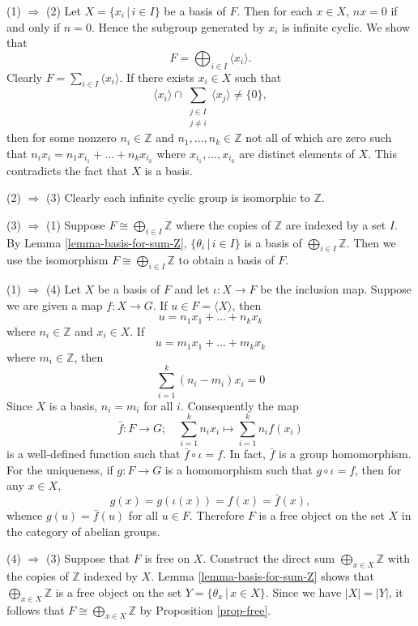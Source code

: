 \begin{sketch}
	(1) $\Rightarrow$ (2) Let $X = \{x_i\,|\, i\in I\}$ be a basis of $F$. Then for each $x \in X$, $nx = 0$ if and only if $n=0$. Hence the subgroup generated by $x_i$ is infinite cyclic. We show that \begin{equation*}
		F = \bigoplus_{i\in I} \langle x_i\rangle.
	\end{equation*} Clearly $F = \sum_{i\in I} \langle x_i\rangle$. If there exists $x_i\in X$ such that $$\langle x_i \rangle \cap \sum_{\substack{j \in I \\ j\neq i}} \langle x_j \rangle \neq \{0\},$$ then for some nonzero $n_i \in \mathbb{Z}$ and $n_{1},\dots, n_{k}\in\mathbb{Z}$ not all of which are zero such that
	$
		n_ix_i = n_{1} x_{i_1} + \dots + n_k  x_{i_k}
	$ where $x_{i_1}, \dots, x_{i_k}$ are distinct elements of $X$. This contradicts the fact that $X$ is a basis.
	
	(2) $\Rightarrow$ (3) Clearly each infinite cyclic group is isomorphic to $\mathbb{Z}$.
	
	(3) $\Rightarrow$ (1) Suppose $F \cong \bigoplus_{i\in I} \mathbb{Z}$ where the copies of $\mathbb{Z}$ are indexed by a set $I$. By Lemma \ref{lemma-basis-for-sum-Z}, $\{\theta_i \,|\,  i \in I\}$ is a basis of $\bigoplus_{i\in I} \mathbb{Z}$. Then we use the isomorphism $F\cong \bigoplus_{i\in I} \mathbb{Z}$ to obtain a basis of $F$.
	
	(1) $\Rightarrow$ (4) Let $X$ be a basis of $F$ and let $\iota: X \rightarrow F$ be the inclusion map. Suppose we are given a map $f: X \rightarrow G$. If $u \in F = \langle X\rangle$, then 
	\begin{equation*}
	u = n_1 x_1 + \dots + n_k x_k
	\end{equation*} where $n_i \in \mathbb{Z}$ and $x_i \in X$. If $$u = m_1 x_1 + \dots + m_k x_k$$ where $m_i \in \mathbb{Z}$, then $$\sum_{i=1}^k (n_i - m_i) x_i = 0$$ Since $X$ is a basis, $n_i = m_i$ for all $i$. Consequently the map 
	\begin{equation*}
		\bar{f}: F \rightarrow G;\quad \sum_{i=1}^k n_i x_i \mapsto \sum_{i=1}^k n_i f(x_i) 
	\end{equation*}  is a well-defined function such that $\bar{f}\circ \iota = f$. In fact, $\bar{f}$ is a group homomorphism. For the uniqueness, if $g: F \rightarrow G$ is a homomorphism such that $g \circ \iota = f$, then for any $x \in X$, $$g(x) = g(\iota(x)) = f(x) = \bar{f}(x),$$ whence $g(u) = \bar{f}(u)$ for all $u\in F$. Therefore  $F$ is a free object on the set $X$ in the category of abelian groups.
	
	(4) $\Rightarrow$ (3) Suppose that $F$ is free on $X$. Construct the direct sum $\bigoplus_{x\in X} \mathbb{Z}$ with the copies of $\mathbb{Z}$ indexed by $X$. Lemma \ref{lemma-basis-for-sum-Z} shows that  $\bigoplus_{x\in X} \mathbb{Z}$ is a free object on the set $Y = \{\theta_x \,|\, x \in X\}$. Since we have $|X| = |Y|$, it follows that $F \cong \bigoplus_{x\in X} \mathbb{Z}$ by Proposition \ref{prop-free}.
\end{sketch}


